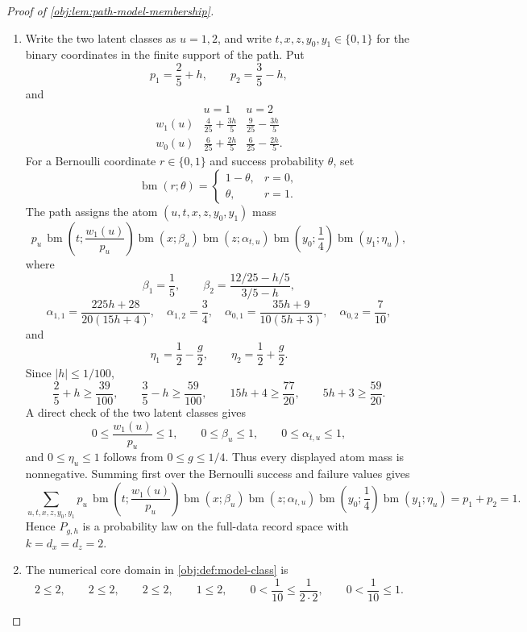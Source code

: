 \begin{proof}[Proof of \cref{obj:lem:path-model-membership}]
\begin{enumerate}
\item Write the two latent classes as \(u=1,2\), and write \(t,x,z,y_0,y_1\in\{0,1\}\) for the binary coordinates in the finite support of the path.  Put
\[
p_1=\frac25+h,\qquad p_2=\frac35-h,
\]
and
\[
\begin{array}{c|cc}
&u=1&u=2\\ \hline
w_1(u)&\frac4{25}+\frac{3h}{5}&\frac9{25}-\frac{3h}{5}\\[0.25em]
w_0(u)&\frac6{25}+\frac{2h}{5}&\frac6{25}-\frac{2h}{5}.
\end{array}
\]
For a Bernoulli coordinate \(r\in\{0,1\}\) and success probability \(\theta\), set
\[
\operatorname{bm}(r;\theta)
=
\begin{cases}
1-\theta,& r=0,\\
\theta,& r=1.
\end{cases}
\]
The path assigns the atom \((u,t,x,z,y_0,y_1)\) mass
\[
p_u\,
\operatorname{bm}\!\left(t;\frac{w_1(u)}{p_u}\right)
\operatorname{bm}(x;\beta_u)
\operatorname{bm}(z;\alpha_{t,u})
\operatorname{bm}\!\left(y_0;\frac14\right)
\operatorname{bm}(y_1;\eta_u),
\]
where
\[
\beta_1=\frac15,\qquad
\beta_2=\frac{12/25-h/5}{3/5-h},
\]
\[
\alpha_{1,1}=\frac{225h+28}{20(15h+4)},\quad
\alpha_{1,2}=\frac34,\quad
\alpha_{0,1}=\frac{35h+9}{10(5h+3)},\quad
\alpha_{0,2}=\frac7{10},
\]
and
\[
\eta_1=\frac12-\frac g2,\qquad \eta_2=\frac12+\frac g2 .
\]
Since \(|h|\le 1/100\),
\[
\frac25+h\ge\frac{39}{100},\qquad
\frac35-h\ge\frac{59}{100},\qquad
15h+4\ge\frac{77}{20},\qquad
5h+3\ge\frac{59}{20}.
\]
A direct check of the two latent classes gives
\[
0\le \frac{w_1(u)}{p_u}\le1,\qquad
0\le \beta_u\le1,\qquad
0\le \alpha_{t,u}\le1,
\]
and \(0\le\eta_u\le1\) follows from \(0\le g\le1/4\).  Thus every displayed atom mass is nonnegative.  Summing first over the Bernoulli success and failure values gives
\[
\sum_{u,t,x,z,y_0,y_1}
p_u\,
\operatorname{bm}\!\left(t;\frac{w_1(u)}{p_u}\right)
\operatorname{bm}(x;\beta_u)
\operatorname{bm}(z;\alpha_{t,u})
\operatorname{bm}\!\left(y_0;\frac14\right)
\operatorname{bm}(y_1;\eta_u)
=
p_1+p_2=1 .
\]
Hence \(P_{g,h}\) is a probability law on the full-data record space with \(k=d_x=d_z=2\). %

\item The numerical core domain in \cref{obj:def:model-class} is
\[
2\le2,\qquad 2\le2,\qquad 2\le2,\qquad 1\le2,\qquad
0<\frac1{10}\le\frac1{2\cdot2},\qquad
0<\frac1{10}\le1 .
\]


\end{enumerate}
\end{proof}
